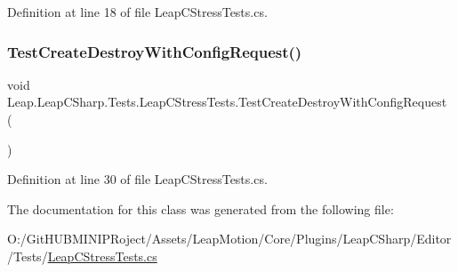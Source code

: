 Definition at line 18 of file Leap\+C\+Stress\+Tests.\+cs.

\mbox{\label{class_leap_1_1_leap_c_sharp_1_1_tests_1_1_leap_c_stress_tests_afa86838cf9e183af95c0f95d41aea543}} 
\subsubsection{\texorpdfstring{TestCreateDestroyWithConfigRequest()}{TestCreateDestroyWithConfigRequest()}}
{\footnotesize\ttfamily void Leap.\+Leap\+C\+Sharp.\+Tests.\+Leap\+C\+Stress\+Tests.\+Test\+Create\+Destroy\+With\+Config\+Request (\begin{DoxyParamCaption}{ }\end{DoxyParamCaption})}



Definition at line 30 of file Leap\+C\+Stress\+Tests.\+cs.



The documentation for this class was generated from the following file\+:\begin{DoxyCompactItemize}
\item 
O\+:/\+Git\+H\+U\+B\+M\+I\+N\+I\+P\+Roject/\+Assets/\+Leap\+Motion/\+Core/\+Plugins/\+Leap\+C\+Sharp/\+Editor/\+Tests/\mbox{\hyperlink{_leap_c_stress_tests_8cs}{Leap\+C\+Stress\+Tests.\+cs}}\end{DoxyCompactItemize}
